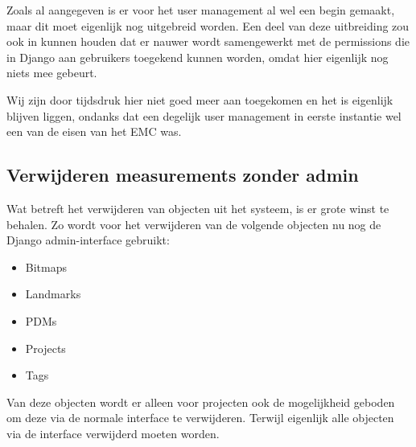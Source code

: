 Zoals al aangegeven is er voor het user management al wel een begin gemaakt, maar dit moet eigenlijk nog uitgebreid worden.
Een deel van deze uitbreiding zou ook in kunnen houden dat er nauwer wordt samengewerkt met de permissions die in Django aan gebruikers toegekend kunnen worden, omdat hier eigenlijk nog niets mee gebeurt.

Wij zijn door tijdsdruk hier niet goed meer aan toegekomen en het is eigenlijk blijven liggen, ondanks dat een degelijk user management in eerste instantie wel een van de eisen van het EMC was.

\subsection{Verwijderen measurements zonder admin}
Wat betreft het verwijderen van objecten uit het systeem, is er grote winst te behalen.
Zo wordt voor het verwijderen van de volgende objecten nu nog de Django admin-interface gebruikt:
\begin{itemize}
  \item Bitmaps
  \item Landmarks
  \item PDMs
  \item Projects
  \item Tags
\end{itemize}
Van deze objecten wordt er alleen voor projecten ook de mogelijkheid geboden om deze via de normale interface te verwijderen. 
Terwijl eigenlijk alle objecten via de interface verwijderd moeten worden.

